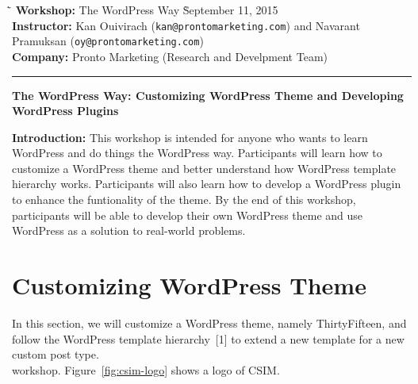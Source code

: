 \documentclass{article}
\begin{document}
\begin{tabbing}
    \`\=\kill
    \textbf{Workshop:} The WordPress Way
    \` September 11, 2015 \\
    \textbf{Instructor:} Kan Ouivirach ({\tt \small kan@prontomarketing.com})
        and Navarant Pramuksan ({\tt \small oy@prontomarketing.com}) \\
    \textbf{Company:} Pronto Marketing (Research and Develpment Team)
\end{tabbing}

\hrule

\vspace{.25in}

\begin{center}
    \textbf{\Large The WordPress Way: Customizing WordPress Theme and
        Developing WordPress Plugins}
\end{center}

\vspace{.15in}

\noindent \textbf{Introduction:} This workshop is intended for anyone who wants
    to learn WordPress and do things the WordPress way. Participants will
    learn how to customize a WordPress theme and better understand how
    WordPress template hierarchy works. Participants will also learn
    how to develop a WordPress plugin to enhance the funtionality of the theme.
    By the end of this workshop, participants will be able to develop their own
    WordPress theme and use WordPress as a solution to real-world problems.

\section*{Customizing WordPress Theme}

\noindent In this section, we will customize a WordPress theme, namely
    ThirtyFifteen, and follow the WordPress template hierarchy~[1] to extend
    a new template for a new custom post type. \\

workshop. Figure~\ref{fig:csim-logo} shows
a logo of CSIM. \\
\end{document}
